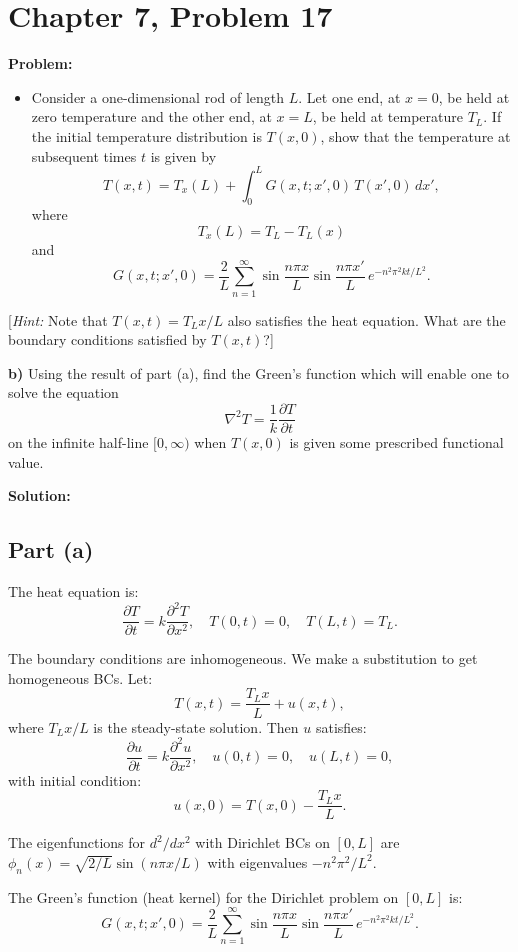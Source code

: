 \documentclass[12pt]{article}
\begin{document}
\section*{Chapter 7, Problem 17}

\textbf{Problem:}
\begin{itemize}
\item[a)] Consider a one-dimensional rod of length $L$. Let one end, at $x = 0$, be held at zero temperature and the other end, at $x = L$, be held at temperature $T_L$. If the initial temperature distribution is $T(x,0)$, show that the temperature at subsequent times $t$ is given by
\[
T(x,t) = T_x(L) + \int_0^L G(x,t;x',0)\,T(x',0)\,dx',
\]
where
\[
T_x(L) = T_L - T_L(x)
\]
and
\[
G(x,t;x',0) = \frac{2}{L}\sum_{n=1}^{\infty}\sin\frac{n\pi x}{L}\sin\frac{n\pi x'}{L}\,e^{-n^2\pi^2 kt/L^2}.
\]
\end{itemize}

[\textit{Hint:} Note that $T(x,t) = T_L x/L$ also satisfies the heat equation. What are the boundary conditions satisfied by $T(x,t)$?]

\textbf{b)} Using the result of part (a), find the Green's function which will enable one to solve the equation
\[
\nabla^2 T = \frac{1}{k}\frac{\partial T}{\partial t}
\]
on the infinite half-line $[0,\infty)$ when $T(x,0)$ is given some prescribed functional value.

\bigskip
\textbf{Solution:}

\subsection*{Part (a)}

The heat equation is:
\[
\frac{\partial T}{\partial t} = k\frac{\partial^2 T}{\partial x^2}, \quad T(0,t) = 0,\quad T(L,t) = T_L.
\]

The boundary conditions are inhomogeneous. We make a substitution to get homogeneous BCs. Let:
\[
T(x,t) = \frac{T_L x}{L} + u(x,t),
\]
where $T_L x/L$ is the steady-state solution. Then $u$ satisfies:
\[
\frac{\partial u}{\partial t} = k\frac{\partial^2 u}{\partial x^2}, \quad u(0,t) = 0,\quad u(L,t) = 0,
\]
with initial condition:
\[
u(x,0) = T(x,0) - \frac{T_L x}{L}.
\]

The eigenfunctions for $d^2/dx^2$ with Dirichlet BCs on $[0,L]$ are $\phi_n(x) = \sqrt{2/L}\sin(n\pi x/L)$ with eigenvalues $-n^2\pi^2/L^2$.

The Green's function (heat kernel) for the Dirichlet problem on $[0,L]$ is:
\[
G(x,t;x',0) = \frac{2}{L}\sum_{n=1}^{\infty}\sin\frac{n\pi x}{L}\sin\frac{n\pi x'}{L}\,e^{-n^2\pi^2 kt/L^2}.
\]
\end{document}
